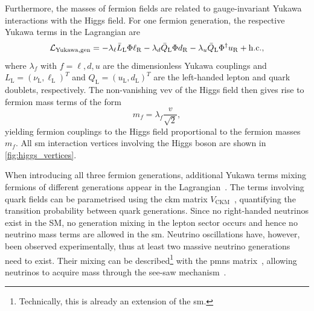 Furthermore, the masses of fermion fields are related to gauge-invariant Yukawa interactions with the Higgs field. For one fermion generation, the respective Yukawa terms in the Lagrangian are
\begin{equation}
	\mathcal{L}_\mathrm{Yukawa,gen} = - \lambda_\ell \bar{L}_\mathrm{L}\Phi\ell_\mathrm{R} - \lambda_d \bar{Q}_\mathrm{L}\Phi d_\mathrm{R} - \lambda_u \bar{Q}_\mathrm{L} \Phi^\dagger u_\mathrm{R} + \mathrm{h.c.},
\end{equation}
where $\lambda_f$ with $f = \ell,d,u$ are the dimensionless Yukawa couplings and $L_\mathrm{L} = (\nu_\mathrm{L},\ell_\mathrm{L})^T$ and $Q_\mathrm{L} = (u_\mathrm{L},d_\mathrm{L})^T$ are the left-handed lepton and quark doublets, respectively. The non-vanishing \gls{vev} of the Higgs field then gives rise to fermion mass terms of the form 
\begin{equation}
 m_f = \lambda_f \frac{v}{\sqrt{2}},
\end{equation}
yielding fermion couplings to the Higgs field proportional to the fermion masses $m_f$. All \gls{sm} interaction vertices involving the Higgs boson are shown in \cref{fig:higgs_vertices}.

When introducing all three fermion generations, additional Yukawa terms mixing fermions of different generations appear in the Lagrangian~\cite{Brock:1354959}. The terms involving quark fields can be parametrised using the \gls{ckm} matrix $V_\mathrm{CKM}$~\cite{PhysRevLett.10.531,CKM:1973fv}, quantifying the transition probability between quark generations. Since no right-handed neutrinos exist in the SM, no generation mixing in the lepton sector occurs and hence no neutrino mass terms are allowed in the \gls{sm}. Neutrino oscillations have, however, been observed experimentally, thus at least two massive neutrino generations need to exist. Their mixing can be described\footnote{Technically, this is already an extension of the \gls{sm}.} with the \gls{pmns} matrix~\cite{PMNS:1962mu}, allowing neutrinos to acquire mass \eg through the see-saw mechanism~\cite{Brdar:2019iem}.
 
